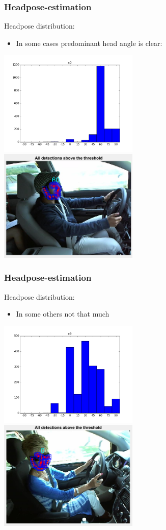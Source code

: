 \documentclass{beamer}
\begin{document}
	\begin{frame}
		\frametitle{Headpose-estimation}
		Headpose distribution:
		\begin{itemize}
			\item In some cases predominant head angle is clear:		

		\end{itemize}
		\includegraphics[width=0.5\textwidth]{headpose_evaluation_c0}
		\includegraphics[width=0.5\textwidth]{face1}
	\end{frame}
	
	\begin{frame}
		\frametitle{Headpose-estimation}
		Headpose distribution:
		\begin{itemize}
			\item In some others not that much
			

		\end{itemize}
		\includegraphics[width=0.5\textwidth]{headpose_evaluation_c9}
		\includegraphics[width=0.5\textwidth]{face6}
	\end{frame}
	
\end{document}
